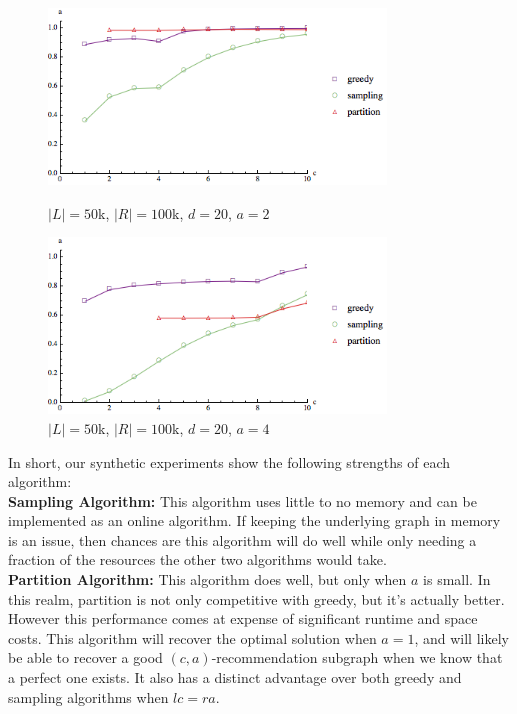 \begin{figure}[t]
\centering
\begin{minipage}[h]{0.48\textwidth}
\centering
\includegraphics[width=0.8\textwidth]{images/l=50000,r=100000,a=2_Greedy_vs_Naive.png}
\caption{$|L|=50$k, $|R|=100$k, $d=20$, $a=2$}\label{fig:a=2}
\end{minipage}
\hspace{0cm}
\begin{minipage}[h]{0.48\textwidth}
\centering
\includegraphics[width=0.8\textwidth]{images/l=50000,r=100000,a=4_Greedy_vs_Naive.png}
\caption{$|L|=50$k, $|R|=100$k, $d=20$, $a=4$}\label{fig:a=4}
\end{minipage}
\vspace{-0.2in}
\end{figure}

\vs
In short, our synthetic experiments show the following strengths of each algorithm:\\
\textbf{Sampling Algorithm:} This algorithm uses little to no memory and can
be implemented as an online algorithm. If keeping the underlying graph in
memory is an issue, then chances are this algorithm will do well while only needing
a fraction of the resources the other two algorithms would take.\\

\textbf{Partition Algorithm:} This algorithm does well, but only when $a$ is small. In this
realm, partition is not only competitive with greedy, but it's actually better. However
this performance comes at expense of significant runtime and space costs. This algorithm
will recover the  optimal solution when $a=1$, and will likely be able to recover a
good $(c,a)$-recommendation subgraph when we know that a perfect one exists. It also has
a distinct advantage over both greedy and sampling algorithms when $lc=ra$. \\


